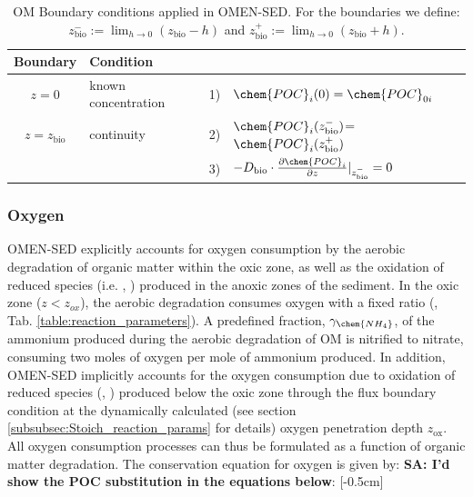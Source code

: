 \documentclass[gmd, manuscript]{copernicus}
\begin{document}
\begin{table}[tbp]
\caption{OM Boundary conditions applied in OMEN-SED. For the boundaries we define:  $z_{\mathrm{bio}}^- := \lim_{h\to0} (z_{\mathrm{bio}}-h)$ and $z_{\mathrm{bio}}^+ := \lim_{h\to0} (z_{\mathrm{bio}}+h)$.}
\centering
\begin{tabular}{ |c| l| c l|}
\hline
\textbf{Boundary}& \textbf{Condition}& &\\
\hline
$z=0$& known concentration& 1)& $\chem{POC}_i(0)=\chem{POC}_{0i}$\\
$z=z_{\mathrm{bio}}$&continuity& 2)& $\chem{POC}_i(z_{\mathrm{bio}}^-)$=$\chem{POC}_i(z_{\mathrm{bio}}^+)$\\
               &&3)&$-D_{\mathrm{bio}}\cdot \frac{\partial \chem{POC}_i}{\partial z}|_{z_{\mathrm{bio}}^-}=0$\\
\hline
\end{tabular}
\label{Tab:BC_OM}
\end{table}


\subsubsection{Oxygen}\label{subsubsec:O2}
OMEN-SED explicitly accounts for oxygen consumption by the aerobic degradation of organic matter within the oxic zone, as well as the oxidation of reduced species (i.e. , ) 
produced in the anoxic zones of the sediment. 
In the oxic zone ($z<z_{ox}$), the aerobic degradation consumes oxygen with a fixed  ratio (, Tab. \ref{table:reaction_parameters}). 
A predefined fraction, $\gamma_\chem{NH_4}$, of the ammonium produced during the aerobic degradation of OM is nitrified to nitrate, consuming two moles of oxygen per mole of ammonium produced. 
In addition, OMEN-SED implicitly accounts for the oxygen consumption due to oxidation of reduced species (, ) produced below the oxic zone through the flux boundary condition at the dynamically calculated 
(see section \ref{subsubsec:Stoich_reaction_params} for details) oxygen penetration depth $z_{\mathrm{ox}}$. 
All oxygen consumption processes can thus be formulated as a function of organic matter degradation. 
The conservation equation for oxygen is given by: \textbf{SA: I'd show the POC substitution in the equations below}:
[-0.5cm]%
\end{document}

